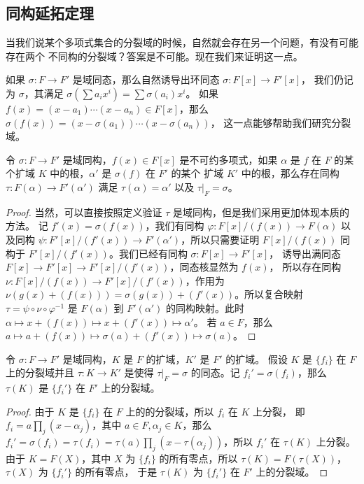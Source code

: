 \subsection{同构延拓定理}

当我们说某个多项式集合的分裂域的时候，自然就会存在另一个问题，有没有可能存在两个
不同构的分裂域？答案是不可能。现在我们来证明这一点。

如果 $\sigma:F\to F'$ 是域同态，那么自然诱导出环同态 $\sigma:F[x]\to F'[x]$，
我们仍记为 $\sigma$，其满足 $\sigma(\sum a_ix^i)=\sum\sigma(a_i)x^i$。
如果 $f(x)=(x-a_1)\cdots(x-a_n)\in F[x]$，那么 $\sigma(f(x))=(x-\sigma(a_1))\cdots(x-\sigma(a_n))$，
这一点能够帮助我们研究分裂域。

\begin{lemma}[同构延拓定理 1]\label{lemma:isomorphism extension 1}
  令 $\sigma:F\to F'$ 是域同构，$f(x)\in F[x]$ 是不可约多项式，如果 $\alpha$
  是 $f$ 在 $F$ 的某个扩域 $K$ 中的根，$\alpha'$ 是 $\sigma(f)$ 在 $F'$ 的某个
  扩域 $K'$ 中的根，那么存在同构 $\tau:F(\alpha)\to F'(\alpha')$ 满足
  $\tau(\alpha)=\alpha'$ 以及 $\tau|_F=\sigma$。
\end{lemma}
\begin{proof}
  当然，可以直接按照定义验证 $\tau$ 是域同构，但是我们采用更加体现本质的方法。
  记 $f'(x)=\sigma(f(x))$，我们有同构 $\varphi:F[x]/(f(x))\to F(\alpha)$ 以及同构
  $\psi:F'[x]/(f'(x))\to F'(\alpha')$，所以只需要证明 $F[x]/(f(x))$ 
  同构于 $F'[x]/(f'(x))$。我们已经有同构 $\sigma:F[x]\to F'[x]$，
  诱导出满同态 $F[x]\to F'[x]\to F'[x]/(f'(x))$，同态核显然为 $f(x)$，
  所以存在同构 $\nu:F[x]/(f(x))\to F'[x]/(f'(x))$，作用为
  $\nu(g(x)+(f(x)))=\sigma(g(x))+(f'(x))$。所以复合映射
  $\tau=\psi\circ \nu\circ\varphi^{-1}$ 是 $F(\alpha)$ 到 $F'(\alpha')$
  的同构映射。此时 $\alpha\mapsto x+(f(x))\mapsto x+(f'(x))\mapsto \alpha'$。
  若 $a\in F$，那么 $a\mapsto a+(f(x))\mapsto \sigma(a)+(f'(x))\mapsto \sigma(a)$。
\end{proof}

\begin{lemma}\label{lemma:tauK is split field}
  令 $\sigma:F\to F'$ 是域同构，$K$ 是 $F$ 的扩域，$K'$ 是 $F'$ 的扩域。
  假设 $K$ 是 $\{f_i\}$ 在 $F$ 上的分裂域并且 $\tau:K\to K'$ 是使得
  $\tau|_F=\sigma$ 的同态。记 $f_i'=\sigma(f_i)$，那么 $\tau(K)$
  是 $\{f_i'\}$ 在 $F'$ 上的分裂域。
\end{lemma}
\begin{proof}
  由于 $K$ 是 $\{f_i\}$ 在 $F$ 上的的分裂域，所以 $f_i$ 在 $K$ 上分裂，
  即 $f_i=a\prod_j (x-\alpha_j)$，其中 $a\in F,\alpha_j\in K$，那么
  $f_i'=\sigma(f_i)=\tau(f_i)=\tau(a)\prod_j(x-\tau(\alpha_j))$，所以
  $f_i'$ 在 $\tau(K)$ 上分裂。由于 $K=F(X)$，其中 $X$ 为 $\{f_i\}$
  的所有零点，所以 $\tau(K)=F(\tau(X))$，$\tau(X)$ 为 $\{f_i'\}$ 的所有零点， 
  于是 $\tau(K)$ 为 $\{f_i'\}$ 在 $F'$ 上的分裂域。
\end{proof}

